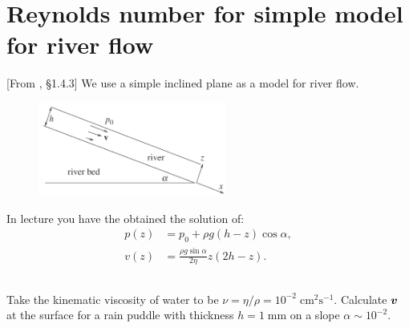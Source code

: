 \documentclass[11pt,letterpaper]{article}
\begin{document}
\section{Reynolds number for simple model for river flow}
[From \cite{Falkovich_18}, \S 1.4.3] 
We use a simple inclined plane as a model for river flow.
\begin{figure}[H]
    \centering
    \includegraphics[width=0.55\textwidth]{figs/incline_river}
\end{figure}

In lecture you have the obtained the solution of:
\begin{align}
    p(z) &= p_0+\rho g(h-z)\cos\alpha,\\
    v(z) &= \frac{\rho g\sin\alpha}{2\eta}z(2h-z).
\end{align}




\subsection{}
Take the kinematic viscosity of water to be $\nu = \eta/\rho = 10^{-2}\;\text{cm}^2\text{s}^{-1}$. Calculate $\boldsymbol{v}$ at the surface for a rain puddle with thickness $h = 1\;\text{mm}$ on a slope $\alpha\sim 10^{-2}$.
\end{document}
